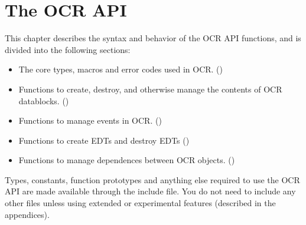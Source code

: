 %

\chapter{The OCR API }
\label{chap:OCRAPI}


This chapter describes the syntax and behavior of the OCR API functions, and is divided
into the following sections:

\begin{itemize}
\item The core types, macros and error codes used in OCR.
()

\item Functions to create, destroy, and otherwise manage the contents of OCR datablocks.
()

\item Functions to manage events in OCR.
()

\item Functions to create EDTs and  destroy EDTs
()

\item Functions to manage dependences between OCR objects.
()

\end{itemize}

Types, constants, function prototypes and anything else required to use the
OCR API are made available through the  include file.  You do not
need to include any other files unless using extended or experimental
features (described in the appendices).


